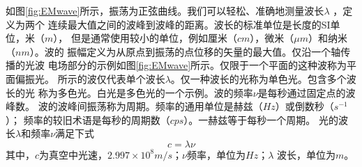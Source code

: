 如图\ref{fig:EMwave}所示，振荡为正弦曲线。我们可以轻松、准确地测量波长$\lambda$
，定义为两个
连续最大值之间的波峰到波峰的距离。波长的标准单位是长度的SI单位，米（$m$），
但是通常使用较小的单位，例如厘米（$cm$），微米（$\mu m$）和纳米（$nm$）。波的
振幅定义为从原点到振荡的点位移的矢量的最大值。仅沿一个轴传播的光波
电场部分的示例如图\ref{fig:EMwave}所示。仅限于一个平面的这种波称为平面偏振光。
所示的波仅代表单个波长$\lambda$。仅一种波长的光称为单色光。包含多个波长的光
称为多色光。白光是多色光的一个示例。波的频率$\nu$是每秒通过固定点的波峰数。
波的波峰间振荡称为周期。频率的通用单位是赫兹（$Hz$）或倒数秒（$s^{-1}$）；
频率的较旧术语是每秒的周期数（$cps$）。一赫兹等于每秒一个周期。
光的波长$\lambda$和频率$\nu$满足下式
\begin{equation}
    c = \lambda\nu
    \label{eq:1st}
\end{equation}
其中，$c$为真空中光速，$2.997\times 10^8 m/s$；$\nu$频率，单位为$Hz$；$\lambda$
波长，单位为$m$。

